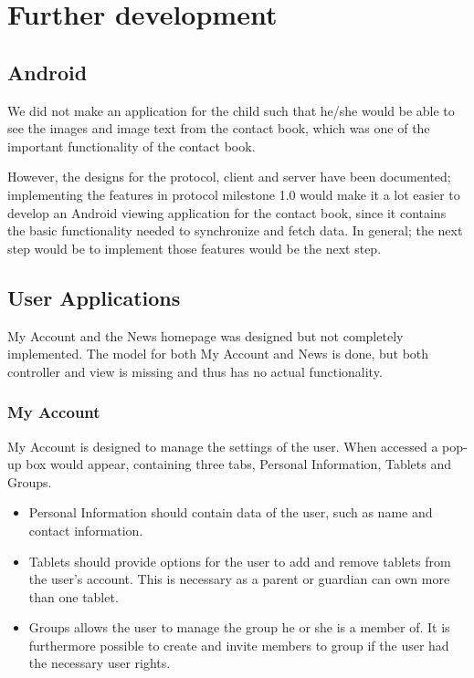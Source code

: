 \chapter{Further development}

\section{Android}
We did not make an application for the child such that he/she would be able to see the images and image text from the contact book, which was one of the important functionality of the contact book.

However, the designs for the protocol, client and server have been documented; implementing the features in protocol milestone 1.0 would make it a lot easier to develop an Android viewing application for the contact book, since it contains the basic functionality needed to synchronize and fetch data. In general; the next step would be to implement those features would be the next step. 


\section{User Applications}

My Account and the News homepage was designed but not completely implemented. The model for both My Account and News is done, but both controller and view is missing and thus has no actual functionality.

\subsection{My Account}
My Account is designed to manage the settings of the user. When accessed a pop-up box would appear, containing three tabs, Personal Information, Tablets and Groups. 
\begin{itemize}
\item Personal Information should contain data of the user, such as name and contact information.
\item Tablets should provide options for the user to add and remove tablets from the user's account. This is necessary as a parent or guardian can own more than one tablet.
\item Groups allows the user to manage the group he or she is a member of. It is furthermore possible to create and invite members to group if the user had the necessary user rights.
\end{itemize} 

